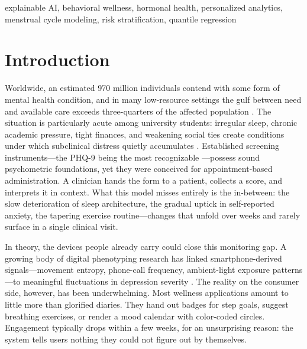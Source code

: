 \documentclass[conference]{IEEEtran}
\begin{document}
\begin{IEEEkeywords}
explainable AI, behavioral wellness, hormonal health, personalized analytics, menstrual cycle modeling, risk stratification, quantile regression
\end{IEEEkeywords}

\section{Introduction}

Worldwide, an estimated 970 million individuals contend with some form of mental health condition, and in many low-resource settings the gulf between need and available care exceeds three-quarters of the affected population \cite{who2022mental}. The situation is particularly acute among university students: irregular sleep, chronic academic pressure, tight finances, and weakening social ties create conditions under which subclinical distress quietly accumulates \cite{adler2022burnout}. Established screening instruments---the PHQ-9 being the most recognizable \cite{kroenke2001phq9}---possess sound psychometric foundations, yet they were conceived for appointment-based administration. A clinician hands the form to a patient, collects a score, and interprets it in context. What this model misses entirely is the in-between: the slow deterioration of sleep architecture, the gradual uptick in self-reported anxiety, the tapering exercise routine---changes that unfold over weeks and rarely surface in a single clinical visit.

In theory, the devices people already carry could close this monitoring gap. A growing body of digital phenotyping research has linked smartphone-derived signals---movement entropy, phone-call frequency, ambient-light exposure patterns---to meaningful fluctuations in depression severity \cite{saeb2015mobile, torous2019digital}. The reality on the consumer side, however, has been underwhelming. Most wellness applications amount to little more than glorified diaries. They hand out badges for step goals, suggest breathing exercises, or render a mood calendar with color-coded circles. Engagement typically drops within a few weeks, for an unsurprising reason: the system tells users nothing they could not figure out by themselves.
\end{document}

